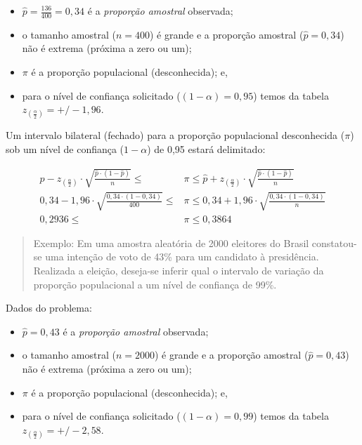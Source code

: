 \documentclass[
]{book}
\providecommand{\tightlist}{%
  \setlength{\itemsep}{0pt}\setlength{\parskip}{0pt}}
\begin{document}
\hfill\break

\begin{itemize}
\tightlist
\item
  \(\hat{p}=\frac{136}{400}=0,34\) é a \emph{proporção amostral} observada;
\item
  o tamanho amostral (\(n=400\)) é grande e a proporção amostral (\(\hat{p}=0,34\)) não é extrema (próxima a zero ou um);\\
\item
  \(\pi\) é a proporção populacional (desconhecida); e,
\item
  para o nível de confiança solicitado (\((1-\alpha)=0,95\)) temos da tabela \({z}_{\left(\frac{\alpha }{2}\right)}= +/-1,96\).
\end{itemize}

\hfill\break

Um intervalo bilateral (fechado) para a proporção populacional desconhecida (\(\pi\)) sob um nível de confiança (\(1-\alpha\)) de 0,95 estará delimitado:

\hfill\break

\begin{align*}
\hat{p} - {z}_{\left(\frac{\alpha }{2}\right)} \cdot  \sqrt{\frac{\hat{p} \cdot \left(1- \hat{p} \right)}{n}}  \le  & \pi \le  \hat{p} + {z}_{\left(\frac{\alpha }{2}\right)} \cdot \sqrt{\frac{\hat{p} \cdot \left(1-\hat{p} \right)}{n}}\\
0,34 - 1,96 \cdot \sqrt{  \frac{0,34 \cdot (1-0,34)}{400} }  \le &  \pi \le  0,34 + 1,96 \cdot \sqrt{  \frac{0,34 \cdot (1-0,34)}{n} }\\
0,2936\le & \pi \le 0,3864
\end{align*}

\hfill\break

\begin{quote}
Exemplo: Em uma amostra aleatória de 2000 eleitores do Brasil constatou-se uma intenção de voto de 43\% para um candidato à presidência. Realizada a eleição, deseja-se inferir qual o intervalo de variação da proporção populacional a um nível de confiança de 99\%.
\end{quote}

\hfill\break

Dados do problema:

\hfill\break

\begin{itemize}
\tightlist
\item
  \(\hat{p}=0,43\) é a \emph{proporção amostral} observada;
\item
  o tamanho amostral (\(n=2000\)) é grande e a proporção amostral (\(\hat{p}=0,43\)) não é extrema (próxima a zero ou um);\\
\item
  \(\pi\) é a proporção populacional (desconhecida); e,
\item
  para o nível de confiança solicitado (\((1-\alpha)=0,99\)) temos da tabela \({z}_{\left(\frac{\alpha }{2}\right)}= +/-2,58\).
\end{itemize}
\end{document}
